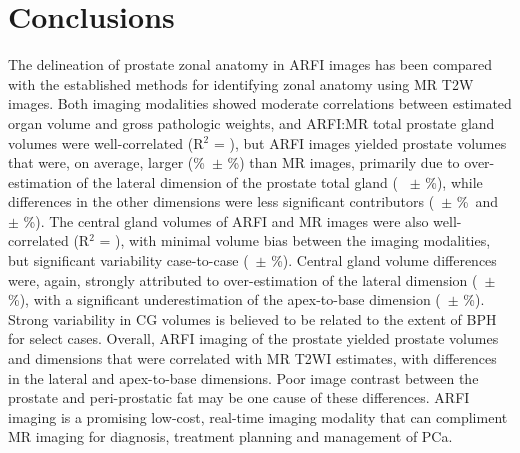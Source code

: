\section{Conclusions}
The delineation of prostate zonal anatomy in ARFI images has been compared with
the established methods for identifying zonal anatomy using MR T2W images.
Both imaging modalities showed moderate correlations between estimated organ
volume and gross pathologic weights, and ARFI:MR total prostate gland volumes
were well-correlated (R$^2$ = \MRarfiVolTotalRsq), but ARFI images yielded
prostate volumes that were, on average, larger (\MRarfiVolTotalMeanDiff\%~$\pm$
\MRarfiVolTotalStdDiff\%) than MR images, primarily due to over-estimation of
the lateral dimension of the prostate total gland (\ARFImrTotalLatLatMeanPct~
$\pm$ \ARFImrTotalLatLatStdPct\%), while differences in the other dimensions
were less significant contributors (\ARFImrTotalAntPostMeanPct~$\pm$
\ARFImrTotalAntPostStdPct\%~and \ARFImrTotalApexBaseMeanPct~$\pm$
\ARFImrTotalApexBaseStdPct\%).  The central gland volumes of ARFI and MR images
were also well-correlated (R$^2$ = \MRarfiVolCentralRsq), with minimal volume
bias between the imaging modalities, but significant variability case-to-case
(\MRarfiVolCentralMeanDiff~$\pm$ \MRarfiVolCentralStdDiff\%).  Central gland
volume differences were, again, strongly attributed to over-estimation of the
lateral dimension (\ARFImrCentralLatLatMeanPct~$\pm$
\ARFImrCentralLatLatStdPct\%), with a significant underestimation of the
apex-to-base dimension (\ARFImrCentralAntPostMeanPct~$\pm$
\ARFImrCentralAntPostStdPct\%).  Strong variability in CG volumes is believed
to be related to the extent of BPH for select cases.  Overall, ARFI imaging of
the prostate yielded prostate volumes and dimensions that were correlated with
MR T2WI estimates, with differences in the lateral and apex-to-base dimensions.
Poor image contrast between the prostate and peri-prostatic fat may be one
cause of these differences.  ARFI imaging is a promising low-cost, real-time
imaging modality that can compliment MR imaging for diagnosis, treatment
planning and management of PCa.
